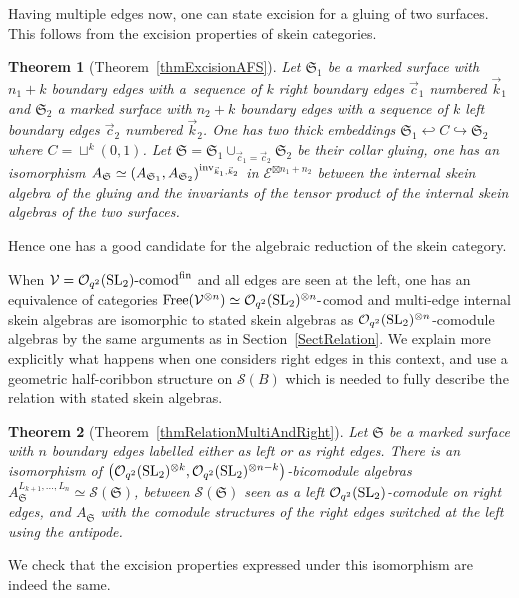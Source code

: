 \documentclass[pdftex]{sigma}%
\numberwithin{equation}{section}
\newtheorem{Theorem}{Theorem}[section]
\newcommand{\Free}{\operatorname{Free}}
\newcommand{\Oqcomfin}{\Oq\text{-}{\rm comod}^{\rm fin}}
\newcommand{\Oq}{\mathcal{O}_{q^2}({\rm SL}_2)}
\begin{document}
Having multiple edges now, one can state excision for a gluing of two surfaces. This follows from the excision properties of skein categories.
\begin{Theorem}[Theorem~\ref{thmExcisionAFS}]
Let $\mathfrak{S}_1$ be a marked surface with $n_1+k$ boundary edges with a~sequence of $k$ right boundary edges $\vec{c}_1$ numbered $\vec{k}_1$ and $\mathfrak{S}_2$ a marked surface with $n_2+k$ boundary edges with a sequence of $k$ left boundary edges $\vec{c}_2$ numbered $\vec{k}_2$. One has two thick embeddings $\mathfrak{S}_1 \hookleftarrow C \hookrightarrow \mathfrak{S}_2$ where $C = \sqcup^k (0,1)$. Let $\mathfrak{S} = \mathfrak{S}_1 \cup_{\vec{c}_1=\vec{c}_2}\mathfrak{S}_2$ be their collar gluing, one has an isomorphism $A_\mathfrak{S} \simeq (A_{\mathfrak{S}_1}, A_{\mathfrak{S}_2})^{{\rm inv}_{\vec{k}_1,\vec{k}_2}}$ in $\mathcal{E}^{\boxtimes n_1+n_2}$ between the internal skein algebra of the gluing and the invariants of the tensor product of the internal skein algebras of the two surfaces.
\end{Theorem}

Hence one has a good candidate for the algebraic reduction of the skein category.

When $\mathcal{V} = \Oqcomfin$ and all edges are seen at the left, one has an equivalence of categories $\Free(\mathcal{V}^{\otimes n}) \simeq \Oq^{\otimes n}\text{-}$comod and multi-edge internal skein algebras are isomorphic to stated skein algebras as $\Oq^{\otimes n}$-comodule algebras by the same arguments as in Section~\ref{SectRelation}. We explain more explicitly what happens when one considers right edges in this context, and use a geometric half-coribbon structure on $\mathscr{S}(B)$ which is needed to fully describe the relation with stated skein algebras.
\begin{Theorem}[Theorem~\ref{thmRelationMultiAndRight}]
Let $\mathfrak{S}$ be a marked surface with $n$ boundary edges labelled either as left or as right edges. There is an isomorphism of $\big(\Oq^{\otimes k},\Oq^{\otimes n-k}\big)$-bicomodule algebras $A_{\mathfrak{S}}^{L_{k+1},\dots,L_n} \simeq \mathscr{S}(\mathfrak{S})$, between $\mathscr{S}(\mathfrak{S})$ seen as a left $\Oq$-comodule on right edges, and $A_\mathfrak{S}$ with the comodule structures of the right edges switched at the left using the antipode.
\end{Theorem}

We check that the excision properties expressed under this isomorphism are indeed the same.
\end{document}
